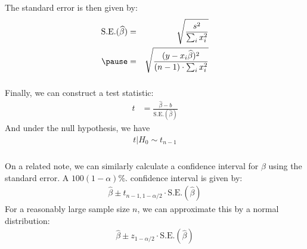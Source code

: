 \begin{frame}[fragile] \frametitle{}

The standard error is then given by:
\begin{eqnarray*}
\text{S.E.}(\widehat{\beta}) &=& \sqrt{\frac{s^2}{\sum_i x_i^2}} \\ \pause
&=& \sqrt{\frac{(y - x_i \widehat{\beta})^2}{(n-1) \cdot \sum_i x_i^2}}
\end{eqnarray*}

\end{frame}

\begin{frame}[fragile] \frametitle{}

Finally, we can construct a test statistic:
\begin{align*}
t &= \frac{\widehat{\beta} - b}{\text{S.E.}(\widehat{\beta})}
\end{align*}
\pause And under the null hypothesis, we have
\begin{align*}
t | H_0  \sim t_{n-1}
\end{align*}

\end{frame}

\begin{frame}[fragile] \frametitle{}

On a related note, we can similarly calculate a confidence
interval for $\beta$ using the standard error. A $100(1-\alpha)\%$.
confidence interval is given by:
\begin{align*}
\widehat{\beta} \pm t_{n-1, 1 - \alpha/2} \cdot \text{S.E.}(\widehat{\beta})
\end{align*}
\pause For a reasonably large sample size $n$, we can approximate
this by a normal distribution:
\begin{align*}
\widehat{\beta} \pm z_{1 - \alpha/2} \cdot \text{S.E.}(\widehat{\beta})
\end{align*}

\end{frame}

